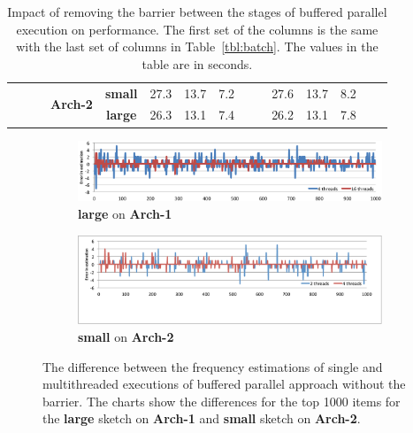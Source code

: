 \documentclass[10pt, conference, compsocconf]{IEEEtran}
\begin{document}
\begin{table}[htbp]
{\begin{tabular}{ccccc||rrrrr|rrrrr}
			&&&\multirow{2}{*}{\textbf{Arch-2}} & \textbf{small}  & 27.3    & 13.7   & 7.2   &        &       &  27.6    &  13.7   & 8.2   &        &       \\
			&&&& \textbf{large} &  26.3      &   13.1     &       7.4 &        &       &     26.2    &     13.1    &     7.8   &        &   \\ %
			
		\end{tabular}
	}
\caption{Impact of removing the barrier between the stages of buffered parallel execution on performance. The first set of the columns is the same with the last set of columns in Table~\ref{tbl:batch}. The values in the table are in seconds.}
\label{tbl:barrier}
\end{table}

\begin{figure}[htbp]
\begin{center}
\begin{subfigure}[t]{\textwidth}
\includegraphics[width=\linewidth]{error1.png}
\caption{{\bf large} on {\bf Arch-1}}
\label{fig:err1}
\end{subfigure}
\end{center}

\begin{center}
\begin{subfigure}[t]{\textwidth}
\includegraphics[width=\linewidth]{error2.pdf}
\caption{{\bf small} on {\bf Arch-2}}
\label{fig:err2}
\end{subfigure}
\end{center}

\caption{The difference between the frequency estimations of single and multithreaded executions of buffered parallel approach without the barrier. The charts show the differences for the top 1000 items for the {\bf large} sketch on {\bf Arch-1} and {\bf small} sketch on {\bf Arch-2}.}
\label{fig:err}
\end{figure}
\end{document}
